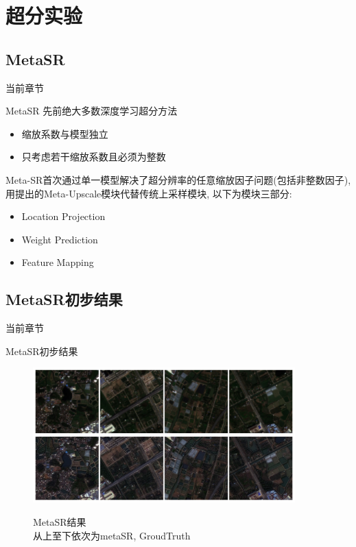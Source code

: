 \section{超分实验}

\subsection{MetaSR}
\begin{frame}{当前章节}
\end{frame}

\begin{frame}{MetaSR} 
    先前绝大多数深度学习超分方法
    \begin{itemize}
        \item 缩放系数与模型独立
        \item 只考虑若干缩放系数且必须为整数
    \end{itemize}

    Meta-SR首次通过单一模型解决了超分辨率的任意缩放因子问题(包括非整数因子), 用提出的Meta-Upscale模块代替传统上采样模块, 以下为模块三部分:
    
    \begin{itemize}
        \item Location Projection
        \item Weight Prediction
        \item Feature Mapping
    \end{itemize}
    
\end{frame}

\subsection{MetaSR初步结果}

\begin{frame}{当前章节}
\end{frame}

\begin{frame}{MetaSR初步结果}
    \begin{figure}[!htbp]
        \centering
        \includegraphics[width=0.9\textwidth]{pic/chap0101.jpg}
        \label{fig:0101}
        \caption{MetaSR结果\\从上至下依次为metaSR, GroudTruth}        
    \end{figure}  
\end{frame}